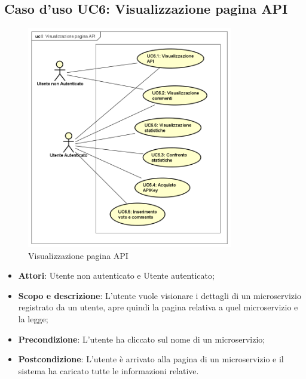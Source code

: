 \documentclass[12pt,a4paper,titlepage]{article}
\begin{document}
	\subsection{Caso d'uso UC6: Visualizzazione pagina API}
	\label{UC6}
	\begin{figure}[H]
		\centering
		\includegraphics[width=0.8\textwidth]{UseCase/VisualizzazionePaginaAPI}
		\caption{Visualizzazione pagina API}
	\end{figure}
	\begin{itemize}
		\item \textbf{Attori}: Utente non autenticato e Utente autenticato;
		\item \textbf{Scopo e descrizione}: L'utente vuole visionare i dettagli di un microservizio registrato da un utente, apre quindi la pagina relativa a quel microservizio e la legge;
		\item \textbf{Precondizione}: L'utente ha cliccato sul nome di un microservizio;
		\item \textbf{Postcondizione}: L'utente è arrivato alla pagina di un microservizio e il sistema ha caricato tutte le informazioni relative.
	\end{itemize}
\end{document}
